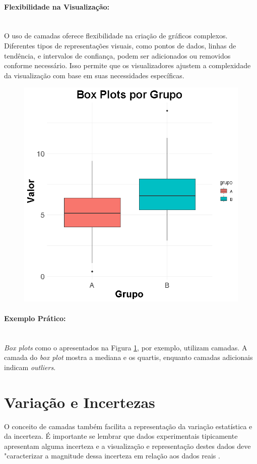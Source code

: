 \documentclass[article]{memoir}
\begin{document}
\paragraph*{Flexibilidade na Visualização:}\mbox{}\\
O uso de camadas oferece flexibilidade na criação de gráficos complexos. Diferentes tipos de representações visuais, como pontos de dados, linhas de tendência, e intervalos de confiança, podem ser adicionados ou removidos conforme necessário. Isso permite que os visualizadores ajustem a complexidade da visualização com base em suas necessidades específicas.

\begin{figure}[ht]
	\centering
	\includegraphics[width=0.5\linewidth]{figs/layers_box_plt_example}
	\caption{}
	\label{fig:layersboxpltexample}
\end{figure}


\paragraph*{Exemplo Prático:}\mbox{}\\
 \textit{Box plots} como o apresentados na Figura 	\ref{fig:layersboxpltexample}, por exemplo, utilizam camadas. A camada do \textit{box plot} mostra a mediana e os quartis, enquanto camadas adicionais indicam \textit{outliers}.


	
\section{Variação e Incertezas}


O conceito de camadas também facilita a representação da variação estatística e da incerteza. É importante se lembrar que dados experimentais tipicamente apresentam alguma incerteza  e a visualização e representação destes dados deve "caracterizar a magnitude dessa incerteza em relação aos dados reais  \cite{wainer1996depicting}. 
\end{document}
